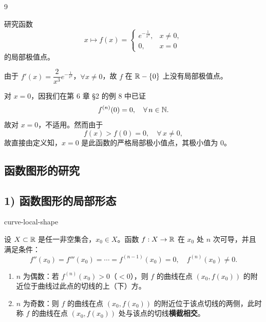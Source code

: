 \begin{sourceexample}{9}

研究函数
\[x\longmapsto f(x)=\begin{cases} e^{-\frac{1}{x^2}}, & x\neq0,\\[1ex] 0, & x=0 \end{cases}\]
的局部极值点。

由于 $f'(x)=\dfrac{2}{x^3}e^{-\frac{1}{x^2}}$，$\forall x\neq0$，故 $f$ 在 $\mathbb{R}-\{0\}$ 上没有局部极值点。

对 $x=0$，因我们在第 6 章 §2 的例 8 中已证
\[f^{(n)}(0)=0,\quad\forall\,n\in\mathbb{N}.\]
故对 $x=0$，不适用。然而由于
\[f(x)>f(0)=0,\quad\forall\,x\neq0,\]
故直接由定义知，$x=0$ 是此函数的严格局部极小值点，其极小值为 $0$。

\end{sourceexample}

\subsection{函数图形的研究}
	\label{sec:8-5-3}

\subsection*{1) 函数图形的局部形态}

\begin{mythm}{}{curve-local-shape}

设 $X\subset\mathbb{R}$ 是任一非空集合，$x_0\in X$。函数 $f:X\to\mathbb{R}$ 在 $x_0$ 处 $n$ 次可导，并且满足条件：
\[f''(x_0)=f'''(x_0)=\cdots=f^{(n-1)}(x_0)=0,\quad f^{(n)}(x_0)\neq0.\]
\begin{enumerate}[label=\arabic{enumi})]
\item $n$ 为偶数：若 $f^{(n)}(x_0)>0$（$<0$），则 $f$ 的曲线在点 $(x_0,f(x_0))$ 的附近位于曲线过此点的切线的上（下）方。
\item $n$ 为奇数：则 $f$ 的曲线在点 $(x_0,f(x_0))$ 的附近位于该点切线的两侧，此时称 $f$ 的曲线在点 $(x_0,f(x_0))$ 处与该点的切线\textbf{横截相交}。
\end{enumerate}

\end{mythm}


